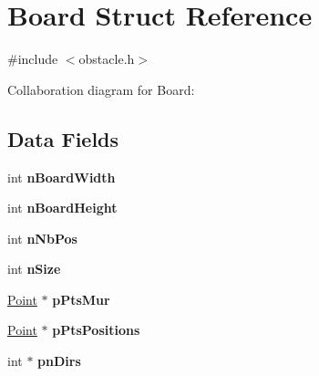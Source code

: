 \hypertarget{struct_board}{}\section{Board Struct Reference}
\label{struct_board}


{\ttfamily \#include $<$obstacle.\+h$>$}



Collaboration diagram for Board\+:
\subsection*{Data Fields}
\begin{DoxyCompactItemize}
\item 
\hypertarget{struct_board_aad80ef820a78438beab291c8afd11537}{}int {\bfseries n\+Board\+Width}\label{struct_board_aad80ef820a78438beab291c8afd11537}

\item 
\hypertarget{struct_board_a7db097fc54460ad93ba4e27f87c6e415}{}int {\bfseries n\+Board\+Height}\label{struct_board_a7db097fc54460ad93ba4e27f87c6e415}

\item 
\hypertarget{struct_board_a5144d35dd645892013c497cebb2e9b1f}{}int {\bfseries n\+Nb\+Pos}\label{struct_board_a5144d35dd645892013c497cebb2e9b1f}

\item 
\hypertarget{struct_board_a69eba13a7543e1379e705b54823531a9}{}int {\bfseries n\+Size}\label{struct_board_a69eba13a7543e1379e705b54823531a9}

\item 
\hypertarget{struct_board_a15b7375925a07516d82c52733ec16874}{}\hyperlink{struct_point}{Point} $\ast$ {\bfseries p\+Pts\+Mur}\label{struct_board_a15b7375925a07516d82c52733ec16874}

\item 
\hypertarget{struct_board_ab251fa666350a133b8b089a26c93a623}{}\hyperlink{struct_point}{Point} $\ast$ {\bfseries p\+Pts\+Positions}\label{struct_board_ab251fa666350a133b8b089a26c93a623}

\item 
\hypertarget{struct_board_a1548ed096f3589f9a471cfad9795f6cd}{}int $\ast$ {\bfseries pn\+Dirs}\label{struct_board_a1548ed096f3589f9a471cfad9795f6cd}

\end{DoxyCompactItemize}


